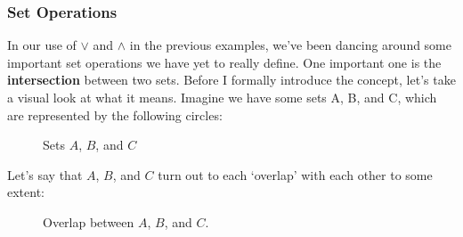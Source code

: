 \documentclass[10pt]{article}
\theoremstyle{definition}
\begin{document}
\subsubsection{Set Operations}
In our use of $\lor$ and $\land$ in the previous examples, we've been
dancing around some important set operations we have yet to really
define.  One important one is the \textbf{intersection} between two
sets.  Before I formally introduce the concept, let's take a visual
look at what it means.  Imagine we have some sets A, B, and C, which
are represented by the following circles:
\begin{figure}[H]
\centering
\def\firstcirclea{(-5,0) circle (1.5cm)}
\def\secondcirclea{(0,0) circle (1.5cm)}
\def\thirdcirclea{(5,0) circle (1.5cm)}
\caption{Sets $A$, $B$, and $C$}
\label{fig:sets}
\end{figure}
Let's say that $A$, $B$, and $C$ turn out to each `overlap' with each
other to some extent:
\begin{figure}[H]
\centering
\def\firstcircle{(0,0) circle (1.5cm)}
\def\secondcircle{(60:2cm) circle (1.5cm)}
\def\thirdcircle{(0:2cm) circle (1.5cm)}
\caption{Overlap between $A$, $B$, and $C$.}
\label{fig:intersection}
\end{figure}
\end{document}
